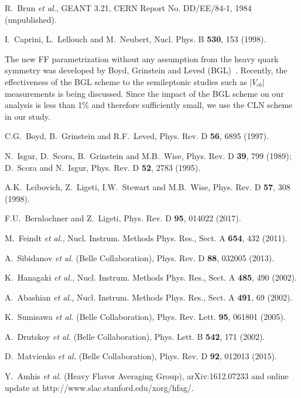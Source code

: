 \documentclass[aps,prd,twocolumn,superscriptaddress,showpacs,preprintnumbers,amsmath,amssymb]{revtex4-1}
\begin{document}
\begin{thebibliography}{99}
  R.~Brun {\it et al.}, GEANT 3.21,
  CERN Report No. DD/EE/84-1, 1984 (unpublished).

  I.~Caprini, L.~Lellouch and M.~Neubert,
  Nucl. Phys. B {\bf 530}, 153 (1998).

  The new FF parametrization without any assumption from the heavy quark symmetry was developed by Boyd, Grinstein and Leved (BGL)~\cite{cite:Boyd:1997}. Recently, the effectiveness of the BGL scheme to the semileptonic studies such as $|V_{cb}|$ measurements is being discussed. Since the impact of the BGL scheme on our analysis is less than 1\% and therefore sufficiently small, we use the CLN scheme in our study.
  
  C.G.~Boyd, B.~Grinstein and R.F.~Leved,
  Phys. Rev. D {\bf 56}, 6895 (1997).
  
  N.~Isgur, D.~Scora, B.~Grinstein and M.B.~Wise,
  Phys. Rev. D {\bf 39}, 799 (1989);
  D.~Scora and N.~Isgur,
  Phys. Rev. D {\bf 52}, 2783 (1995). 

  A.K.~Leibovich, Z.~Ligeti, I.W.~Stewart and M.B.~Wise,
  Phys. Rev. D {\bf 57}, 308 (1998).

  F.U.~Bernlochner and Z.~Ligeti,
  Phys. Rev. D {\bf 95}, 014022 (2017).

  M.~Feindt {\it et al.},
  Nucl. Instrum. Methods Phys. Res., Sect. A {\bf 654}, 432 (2011).

  A.~Sibidanov {\it et al.} (Belle Collaboration),
  Phys. Rev. D {\bf 88}, 032005 (2013).

  K.~Hanagaki {\it et al.},
  Nucl. Instrum. Methods Phys. Res., Sect. A {\bf 485}, 490 (2002).
  
  A.~Abashian {\it et al.},
  Nucl. Instrum. Methods Phys. Res., Sect. A {\bf 491}, 69 (2002).

  K.~Sumisawa {\it et al.} (Belle Collaboration),
  Phys. Rev. Lett. {\bf 95}, 061801 (2005).
  
  A.~Drutskoy {\it et al.} (Belle Collaboration),
  Phys. Lett. B {\bf 542}, 171 (2002). 

  D.~Matvienko {\it et al.} (Belle Collaboration),
  Phys. Rev. D {\bf 92}, 012013 (2015). 

  Y.~Amhis {\it et al.} (Heavy Flavor Averaging Group),
  arXiv:1612.07233 and online update at http://www.slac.stanford.edu/xorg/hfag/.

\end{thebibliography}
\end{document}
